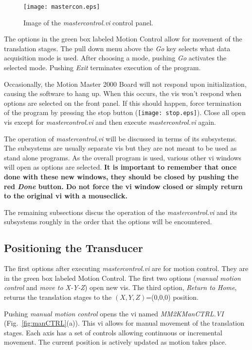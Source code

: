 \documentclass[10pt]{article}
\begin{document}
\begin{figure}[htb]
\begin{center}
\texttt{[image: mastercon.eps]}
 \caption{Image of the {\it mastercontrol.vi} control panel.}
 \label{fig:mastercon}
\end{center}
\end{figure}

The options in the green box labeled Motion Control allow for
movement of the translation stages. The pull down menu above the
{\it Go} key selects what data acquisition mode is used. After
choosing a mode, pushing {\it Go} activates the selected mode.
Pushing {\it Exit} terminates execution of the program.

Occasionally, the Motion Master 2000 Board will not respond upon
initialization, causing the software to hang up. When this occurs,
the vis won't respond when options are selected on the front
panel. If this should happen, force termination of the program by
pressing the stop button (\texttt{[image: stop.eps]}). Close all
open vis except for {\it mastercontrol.vi} and then execute {\it
mastercontrol.vi} again.

The operation of {\it mastercontrol.vi} will be discussed in terms
of its subsystems. The subsystems are usually separate vis but
they are not meant to be used as stand alone programs. As the
overall program is used, various other vi windows will open as
options are selected. {\bf It is important to remember that once
done with these new windows, they should be closed by pushing the
red {\it Done} button. Do not force the vi window closed or simply
return to the original vi with a mouseclick.}

The remaining subsections discus the operation of the {\it
mastercontrol.vi} and its subsystems roughly in the order that the
options will be encountered.

\subsection{Positioning the Transducer}

The first options after executing {\it mastercontrol.vi} are for
motion control. They are in the green box labeled Motion Control.
The first two options ({\it manual motion control} and {\it move
to X-Y-Z}) open new vis. The third option, {\it Return to Home},
returns the translation stages to the $(X,Y,Z)$=(0,0,0) position.

Pushing {\it manual motion control} opens the vi named {\it
MM2KManCTRL.VI} (Fig.~\ref{fig:manCTRL}(a)). This vi allows for
manual movement of the translation stages. Each axis has a set of
controls allowing continuous or incremental movement. The current
position is actively updated as motion takes place.
\end{document}
